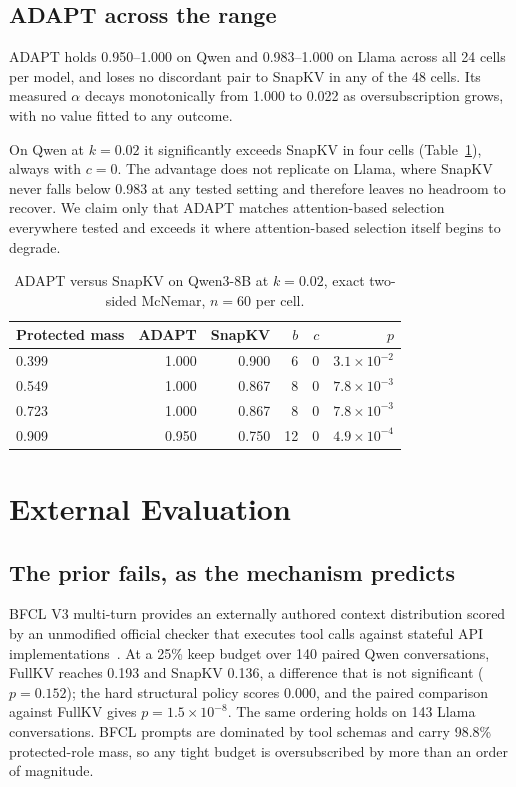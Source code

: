 \subsection{ADAPT across the range}
\label{sec:sweep-adapt}

ADAPT holds 0.950--1.000 on Qwen and 0.983--1.000 on Llama across all 24 cells
per model, and loses no discordant pair to SnapKV in any of the 48 cells.  Its
measured $\alpha$ decays monotonically from 1.000 to 0.022 as oversubscription
grows, with no value fitted to any outcome.

On Qwen at $k=0.02$ it significantly exceeds SnapKV in four cells
(Table~\ref{tab:adapt}), always with $c=0$.  The advantage does not replicate on
Llama, where SnapKV never falls below 0.983 at any tested setting and therefore
leaves no headroom to recover.  We claim only that ADAPT matches attention-based
selection everywhere tested and exceeds it where attention-based selection
itself begins to degrade.

\begin{table}[!htbp]
  \centering
  \caption{ADAPT versus SnapKV on Qwen3-8B at $k=0.02$, exact two-sided
  McNemar, $n=60$ per cell.}
  \label{tab:adapt}
  \begin{tabular}{lrrrrr}
    \toprule
    Protected mass & ADAPT & SnapKV & $b$ & $c$ & $p$ \\
    \midrule
    0.399 & 1.000 & 0.900 & 6  & 0 & $3.1\times10^{-2}$ \\
    0.549 & 1.000 & 0.867 & 8  & 0 & $7.8\times10^{-3}$ \\
    0.723 & 1.000 & 0.867 & 8  & 0 & $7.8\times10^{-3}$ \\
    0.909 & 0.950 & 0.750 & 12 & 0 & $4.9\times10^{-4}$ \\
    \bottomrule
  \end{tabular}
\end{table}

\section{External Evaluation}
\label{sec:external}

\subsection{The prior fails, as the mechanism predicts}
\label{sec:external-transfer}

BFCL V3 multi-turn provides an externally authored context distribution scored
by an unmodified official checker that executes tool calls against stateful API
implementations~\cite{patil2025bfcl}.  At a 25\% keep budget over 140 paired
Qwen conversations, FullKV reaches 0.193 and SnapKV 0.136, a difference that is
not significant ($p=0.152$); the hard structural policy scores 0.000, and the
paired comparison against FullKV gives $p=1.5\times10^{-8}$.  The same ordering
holds on 143 Llama conversations.  BFCL prompts are dominated by tool schemas
and carry 98.8\% protected-role mass, so any tight budget is oversubscribed by
more than an order of magnitude.

